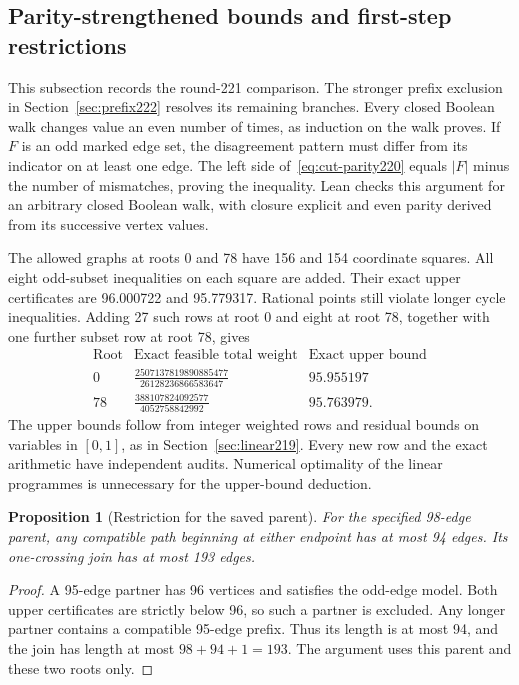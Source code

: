 \documentclass[11pt,a4paper]{article}
\newtheorem{proposition}[theorem]{Proposition}
\theoremstyle{definition}
\theoremstyle{remark}
\begin{document}
\subsection{Parity-strengthened bounds and first-step restrictions}
\label{sec:parity221}
This subsection records the round-221 comparison. The stronger prefix
exclusion in Section~\ref{sec:prefix222} resolves its remaining branches.
Every closed Boolean walk changes value an even number of times, as
induction on the walk proves. If $F$ is an odd marked edge set, the
disagreement pattern must differ from its indicator on at least one edge.
The left side of~\eqref{eq:cut-parity220} equals $|F|$ minus the number
of mismatches, proving the inequality. Lean checks this argument for
an arbitrary closed Boolean walk, with closure explicit and even parity
derived from its successive vertex values.

The allowed graphs at roots 0 and 78 have 156 and 154 coordinate squares.
All eight odd-subset inequalities on each square are added. Their exact
upper certificates are 96.000722 and 95.779317. Rational points still
violate longer cycle inequalities. Adding 27 such rows at root 0 and
eight at root 78, together with one further subset row at root 78, gives
\[
\begin{array}{c|c|c}
\text{Root}&\text{Exact feasible total weight}&\text{Exact upper bound}\\\hline
0&\displaystyle\frac{2507137819890885477}{26128236866583647}&95.955197\\[6pt]
78&\displaystyle\frac{388107824092577}{4052758842992}&95.763979.
\end{array}
\]
The upper bounds follow from integer weighted rows and residual bounds
on variables in $[0,1]$, as in Section~\ref{sec:linear219}. Every new row
and the exact arithmetic have independent audits. Numerical optimality
of the linear programmes is unnecessary for the upper-bound deduction.

\begin{proposition}[Restriction for the saved parent]\label{prop:parent193}
For the specified 98-edge parent, any compatible path beginning at either
endpoint has at most 94 edges. Its one-crossing join has at most 193 edges.
\end{proposition}
\begin{proof}
A 95-edge partner has 96 vertices and satisfies the odd-edge model.
Both upper certificates are strictly below 96, so such a partner is
excluded. Any longer partner contains a compatible 95-edge prefix.
Thus its length is at most 94, and the join has length at most
$98+94+1=193$. The argument uses this parent and these two roots only.
\end{proof}
\end{document}
